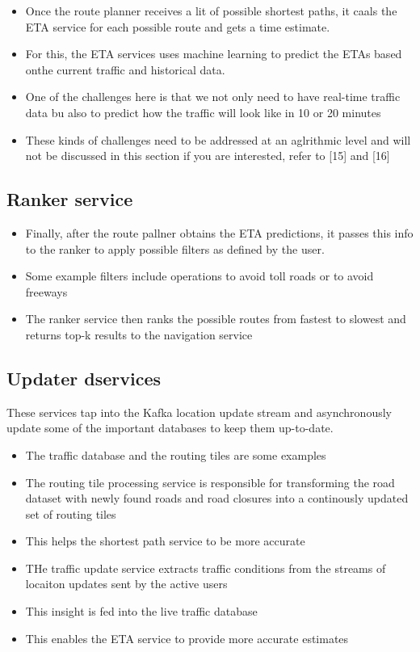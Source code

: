 \documentclass{report}
\theoremstyle{definition}
\let\oldsubsection\subsection
\renewcommand{\subsection}{\oldsubsection*}
\begin{document}
\begin{itemize}
\item
Once the route planner receives a lit of possible shortest paths, it caals the ETA service for each possible route and gets a time estimate.
\item
For this, the ETA services uses machine learning to predict the ETAs based onthe current traffic and historical data.
\item
One of the challenges here is that we not only need to have real-time traffic data bu also to predict how the traffic will look like in 10 or 20 minutes
\item
These kinds of challenges need to be addressed at an aglrithmic level and will not be discussed in this section if you are interested, refer to [15] and [16]
\end{itemize}

\subsection{Ranker service}

\begin{itemize}
\item
Finally, after the route pallner obtains the ETA predictions, it passes this info to the ranker to apply possible filters
as defined by the user.
\item
Some example filters include operations to avoid toll roads or to avoid freeways
\item
The ranker service then ranks the possible routes from fastest to slowest and returns top-k results to the navigation service
\end{itemize}

\subsection{Updater dservices}

These services tap into the Kafka location update stream and asynchronously update some of the important databases to keep them up-to-date.

\begin{itemize}
\item
The traffic database and the routing tiles are some examples
\item
The routing tile processing service is responsible for transforming the road dataset with newly found roads and road closures into a continously updated set of routing tiles
\item
This helps the shortest path service to be more accurate
\item
THe traffic update service extracts traffic conditions from the streams of locaiton updates sent by the active users
\item
This insight is fed into the live traffic database
\item
This enables the ETA service to provide more accurate estimates
\end{itemize}
\end{document}
